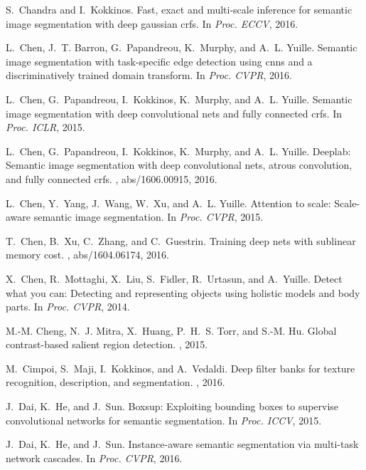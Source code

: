 \documentclass[10pt,twocolumn,letterpaper]{article}
\begin{document}
\begin{thebibliography}{100}
	S.~Chandra and I.~Kokkinos.
	\newblock Fast, exact and multi-scale inference for semantic image segmentation
	with deep gaussian crfs.
	\newblock In {\em Proc. {ECCV}}, 2016.
	
	L.~Chen, J.~T. Barron, G.~Papandreou, K.~Murphy, and A.~L. Yuille.
	\newblock Semantic image segmentation with task-specific edge detection using
	cnns and a discriminatively trained domain transform.
	\newblock In {\em Proc. {CVPR}}, 2016.
	
	L.~Chen, G.~Papandreou, I.~Kokkinos, K.~Murphy, and A.~L. Yuille.
	\newblock Semantic image segmentation with deep convolutional nets and fully
	connected crfs.
	\newblock In {\em Proc. {ICLR}}, 2015.
	
	L.~Chen, G.~Papandreou, I.~Kokkinos, K.~Murphy, and A.~L. Yuille.
	\newblock Deeplab: Semantic image segmentation with deep convolutional nets,
	atrous convolution, and fully connected crfs.
	, abs/1606.00915, 2016.
	
	L.~Chen, Y.~Yang, J.~Wang, W.~Xu, and A.~L. Yuille.
	\newblock Attention to scale: Scale-aware semantic image segmentation.
	\newblock In {\em Proc. {CVPR}}, 2015.
	
	T.~Chen, B.~Xu, C.~Zhang, and C.~Guestrin.
	\newblock Training deep nets with sublinear memory cost.
	, abs/1604.06174, 2016.
	
	X.~Chen, R.~Mottaghi, X.~Liu, S.~Fidler, R.~Urtasun, and A.~Yuille.
	\newblock Detect what you can: Detecting and representing objects using
	holistic models and body parts.
	\newblock In {\em Proc. {CVPR}}, 2014.
	
	M.-M. Cheng, N.~J. Mitra, X.~Huang, P.~H.~S. Torr, and S.-M. Hu.
	\newblock Global contrast-based salient region detection.
	, 2015.
	
	M.~Cimpoi, S.~Maji, I.~Kokkinos, and A.~Vedaldi.
	\newblock Deep filter banks for texture recognition, description, and
	segmentation.
	, 2016.
	
	J.~Dai, K.~He, and J.~Sun.
	\newblock Boxsup: Exploiting bounding boxes to supervise convolutional networks
	for semantic segmentation.
	\newblock In {\em Proc. {ICCV}}, 2015.
	
	J.~Dai, K.~He, and J.~Sun.
	\newblock Instance-aware semantic segmentation via multi-task network cascades.
	\newblock In {\em Proc. {CVPR}}, 2016.
	

\end{thebibliography}
\end{document}
